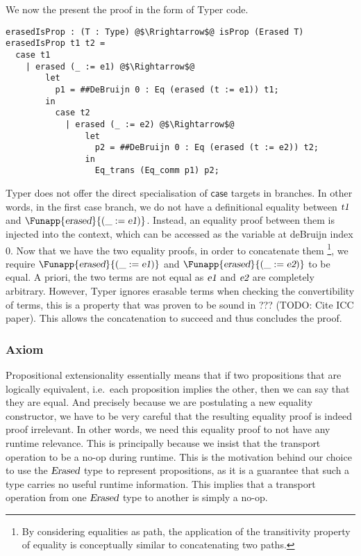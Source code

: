 \documentclass[11pt]{article}
\newcommand\kw[1] {\textsf{#1}}
\newcommand\id[1] {\textsl{#1}}
\begin{document}
We now the present the proof in the form of Typer code.

\begin{verbatim}
erasedIsProp : (T : Type) @$\Rrightarrow$@ isProp (Erased T)
erasedIsProp t1 t2 =
  case t1
    | erased (_ := e1) @$\Rightarrow$@
        let
          p1 = ##DeBruijn 0 : Eq (erased (t := e1)) t1;
        in
          case t2
            | erased (_ := e2) @$\Rightarrow$@
                let
                  p2 = ##DeBruijn 0 : Eq (erased (t := e2)) t2;
                in
                  Eq_trans (Eq_comm p1) p2;
\end{verbatim}

Typer does not offer the direct specialisation of $\kw{case}$ targets in branches. In other words, in the first case branch, we do not have a definitional equality between $\id{t1}$ and $\Funapp{\id{erased}}{(\earg{\_}{\id{e1}})}$. Instead, an equality proof between them is injected into the context, which can be accessed as the variable at deBruijn index 0. Now that we have the two equality proofs, in order to concatenate them \footnote{By considering equalities as path, the application of the transitivity property of equality is conceptually similar to concatenating two paths.}, we require $\Funapp{\id{erased}}{(\earg{\_}{\id{e1}})}$ and $\Funapp{\id{erased}}{(\earg{\_}{\id{e2}})}$ to be equal. A priori, the two terms are not equal as $\id{e1}$ and $\id{e2}$ are completely arbitrary. However, Typer ignores erasable terms when checking the convertibility of terms, this is a property that was proven to be sound in ??? (TODO: Cite ICC paper). This allows the concatenation to succeed and thus concludes the proof.

\subsubsection{Axiom}
Propositional extensionality essentially means that if two propositions that are logically equivalent, i.e.\ each proposition implies the other, then we can say that they are equal. And precisely because we are postulating a new equality constructor, we have to be very careful that the resulting equality proof is indeed proof irrelevant. In other words, we need this equality proof to not have any runtime relevance. This is principally because we insist that the transport operation to be a no-op during runtime. This is the motivation behind our choice to use the $\id{Erased}$ type to represent propositions, as it is a guarantee that such a type carries no useful runtime information. This implies that a transport operation from one $\id{Erased}$ type to another is simply a no-op.
\end{document}

